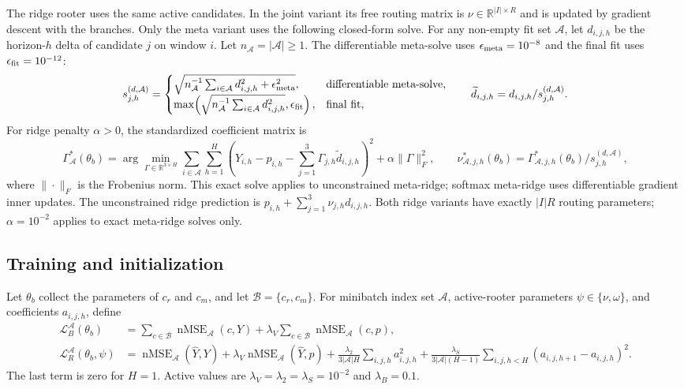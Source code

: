 \documentclass[10pt]{article}
\newcommand{\reals}{\mathbb{R}}
\newcommand{\nMSE}{\operatorname{nMSE}}
\begin{document}
The ridge rooter uses the same active candidates. In the joint variant its free
routing matrix is $\nu\in\reals^{|I|\times R}$ and is updated
by gradient descent with the branches. Only the meta variant uses the following
closed-form solve.
For any non-empty fit set $\mathcal A$, let
$d_{i,j,h}$ be the horizon-$h$ delta of candidate $j$ on window $i$. Let
$n_{\mathcal A}=|\mathcal A|\geq1$. The differentiable meta-solve uses
$\epsilon_{\rm meta}=10^{-8}$ and the final fit uses
$\epsilon_{\rm fit}=10^{-12}$:
\[
 s_{j,h}^{(d,\mathcal A)}=
 \begin{cases}
  \sqrt{n_{\mathcal A}^{-1}\sum_{i\in\mathcal A}d_{i,j,h}^2
   +\epsilon_{\rm meta}^2},&\text{differentiable meta-solve},\\
  \max\!\left(\sqrt{n_{\mathcal A}^{-1}\sum_{i\in\mathcal A}d_{i,j,h}^2},
   \epsilon_{\rm fit}\right),&\text{final fit},
 \end{cases}
 \qquad \widetilde d_{i,j,h}=d_{i,j,h}/s_{j,h}^{(d,\mathcal A)}.
\]
For ridge penalty $\alpha>0$, the standardized coefficient matrix is
\[
 \Gamma^*_{\mathcal A}(\theta_b)=\arg\min_{\Gamma\in\reals^{3\times H}}
 \sum_{i\in\mathcal A}\sum_{h=1}^H
 \left(Y_{i,h}-p_{i,h}
  -\sum_{j=1}^{3}\Gamma_{j,h}\widetilde d_{i,j,h}\right)^2
 +\alpha\|\Gamma\|_F^2,
 \qquad \nu^*_{\mathcal A,j,h}(\theta_b)
 =\Gamma^*_{\mathcal A,j,h}(\theta_b)/s_{j,h}^{(d,\mathcal A)},
\]
where $\|\cdot\|_F$ is the Frobenius norm. This exact solve applies to
unconstrained meta-ridge; softmax meta-ridge uses differentiable gradient inner
updates. The unconstrained ridge prediction is
$p_{i,h}+\sum_{j=1}^{3}\nu_{j,h}d_{i,j,h}$. Both ridge variants have exactly
$|I|R$ routing parameters; $\alpha=10^{-2}$ applies to exact meta-ridge solves only.

\subsection{Training and initialization}

Let $\theta_b$ collect the parameters of $c_r$ and $c_m$, and let
$\mathcal B=\{c_r,c_m\}$. For minibatch index set $\mathcal A$, active-rooter
parameters $\psi\in\{\nu,\omega\}$, and coefficients $a_{i,j,h}$, define
\begin{align}
 \mathcal L_B^{\mathcal A}(\theta_b)
 &=\sum_{c\in\mathcal B}\nMSE_{\mathcal A}(c,Y)
 +\lambda_V\sum_{c\in\mathcal B}\nMSE_{\mathcal A}(c,p),\\
 \mathcal L_R^{\mathcal A}(\theta_b,\psi)
 &=\nMSE_{\mathcal A}(\widehat Y,Y)+\lambda_V\nMSE_{\mathcal A}(\widehat Y,p)
 +\frac{\lambda_2}{3|\mathcal A|H}\sum_{i,j,h}a_{i,j,h}^2
 +\frac{\lambda_S}{3|\mathcal A|(H-1)}\sum_{i,j,h<H}
 (a_{i,j,h+1}-a_{i,j,h})^2.
\end{align}
The last term is zero for $H=1$. Active values are
$\lambda_V=\lambda_2=\lambda_S=10^{-2}$ and $\lambda_B=0.1$.
\end{document}
